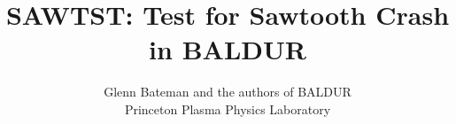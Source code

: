%
%
%
%
%
%

\oddsidemargin 0pt \textwidth 6.5in

\title{SAWTST: Test for Sawtooth Crash in BALDUR}
\author{Glenn Bateman and the authors of BALDUR \\
        Princeton Plasma Physics Laboratory}


\maketitle                 %

